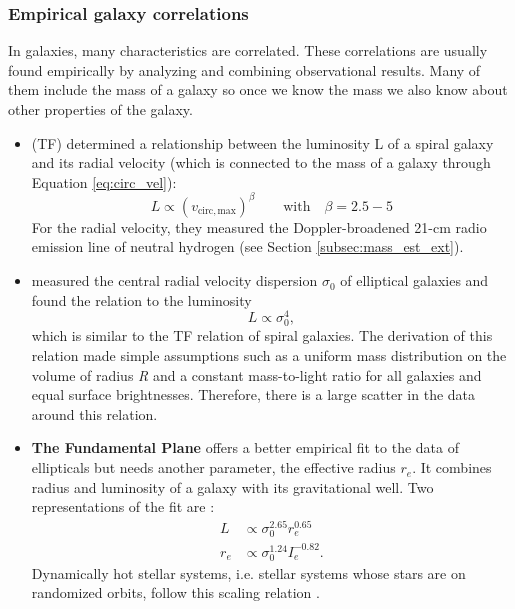 \subsubsection{Empirical galaxy correlations}
In galaxies, many characteristics are correlated. These correlations are usually found empirically by analyzing and combining observational results. Many of them include the mass of a galaxy so once we know the mass we also know about other properties of the galaxy. 
\begin{itemize}
    \item \textbf{\citet{Tully...Fisher...1977}} (TF) determined a relationship between the luminosity L of a spiral galaxy and its radial velocity (which is connected to the mass of a galaxy through Equation \ref{eq:circ_vel}):
    \begin{equation}
        L \propto (v_{\mathrm{circ, max}})^\beta \qquad \mathrm{with}\quad \beta =  2.5 - 5
    \end{equation}
    For the radial velocity, they measured the Doppler-broadened 21-cm radio emission line of neutral hydrogen (see Section \ref{subsec:mass_est_ext}). 
    \item \textbf{\citet{Faber...Jackson...1976}} measured the central radial velocity dispersion $\sigma_0$ of elliptical galaxies and found the relation to the luminosity  
    \begin{equation}
        L \propto \sigma_0^4,
    \end{equation}
    which is similar to the \acs{TF} relation of spiral galaxies. The derivation of this relation made simple assumptions such as a uniform mass distribution on the volume of radius \textit{R} and a constant mass-to-light ratio for all galaxies and equal surface brightnesses. Therefore, there is a large scatter in the data around this relation.
    \item \textbf{The Fundamental Plane} offers a better empirical fit to the data of ellipticals but needs another parameter, the effective radius $r_e$. It combines radius and luminosity of a galaxy with its gravitational well. Two representations of the fit are \citep{Carroll...Ostlie..2006}:
    \begin{align}
        L &\propto \sigma_0^{2.65}r_e^{0.65} \\
        r_e &\propto \sigma_0^{1.24}I_e^{-0.82}.
    \end{align}
    Dynamically hot stellar systems, i.e. stellar systems whose stars are on randomized orbits, follow this scaling relation \citep{Misgeld...hotss.FP...2011}.
    \iffalse\item M\_vir - N\_GC \fi
\end{itemize}

